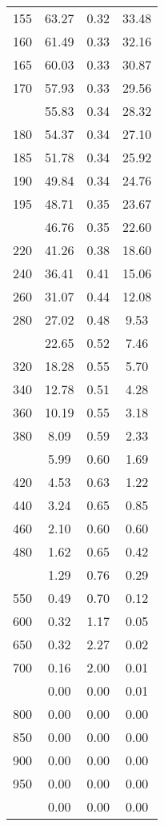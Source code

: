 \begin{table}[ht]
\begin{tabular}{lccc}
  155 & 63.27 & 0.32 & 33.48 \\ 
  160 & 61.49 & 0.33 & 32.16 \\ 
  165 & 60.03 & 0.33 & 30.87 \\ 
  170 & 57.93 & 0.33 & 29.56 \\ 
   \addlinespace
175 & 55.83 & 0.34 & 28.32 \\ 
  180 & 54.37 & 0.34 & 27.10 \\ 
  185 & 51.78 & 0.34 & 25.92 \\ 
  190 & 49.84 & 0.34 & 24.76 \\ 
  195 & 48.71 & 0.35 & 23.67 \\ 
   \addlinespace
200 & 46.76 & 0.35 & 22.60 \\ 
  220 & 41.26 & 0.38 & 18.60 \\ 
  240 & 36.41 & 0.41 & 15.06 \\ 
  260 & 31.07 & 0.44 & 12.08 \\ 
  280 & 27.02 & 0.48 & 9.53 \\ 
   \addlinespace
300 & 22.65 & 0.52 & 7.46 \\ 
  320 & 18.28 & 0.55 & 5.70 \\ 
  340 & 12.78 & 0.51 & 4.28 \\ 
  360 & 10.19 & 0.55 & 3.18 \\ 
  380 & 8.09 & 0.59 & 2.33 \\ 
   \addlinespace
400 & 5.99 & 0.60 & 1.69 \\ 
  420 & 4.53 & 0.63 & 1.22 \\ 
  440 & 3.24 & 0.65 & 0.85 \\ 
  460 & 2.10 & 0.60 & 0.60 \\ 
  480 & 1.62 & 0.65 & 0.42 \\ 
   \addlinespace
500 & 1.29 & 0.76 & 0.29 \\ 
  550 & 0.49 & 0.70 & 0.12 \\ 
  600 & 0.32 & 1.17 & 0.05 \\ 
  650 & 0.32 & 2.27 & 0.02 \\ 
  700 & 0.16 & 2.00 & 0.01 \\ 
   \addlinespace
750 & 0.00 & 0.00 & 0.01 \\ 
  800 & 0.00 & 0.00 & 0.00 \\ 
  850 & 0.00 & 0.00 & 0.00 \\ 
  900 & 0.00 & 0.00 & 0.00 \\ 
  950 & 0.00 & 0.00 & 0.00 \\ 
   \addlinespace
1000 & 0.00 & 0.00 & 0.00 \\ 
   \bottomrule
\end{tabular}
\end{table}
